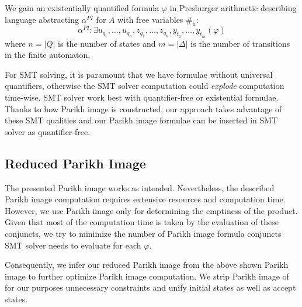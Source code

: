 We gain an existentially quantified formula $\varphi$ in Presburger arithmetic describing language abstracting $\alpha^{PI}$ for $A$ with free variables $\#_a$:
$$ \alpha^{PI} : \exists u_{q_1},\ldots,u_{q_n},z_{q_1},\ldots,z_{q_n},y_{t_1},\ldots,y_{t_m} ( \varphi ) $$
where $n = \lvert Q \rvert$ is the number of states and $m = \lvert \Delta \rvert$ is the number of transitions in the finite automaton.

For SMT solving, it is paramount that we have formulae without universal quantifiers, otherwise the SMT solver computation could \emph{explode} computation time-wise. SMT solver work best with quantifier-free or existential formulae. Thanks to how Parikh image is constructed, our approach takes advantage of these SMT qualities and our Parikh image formulae can be inserted in SMT solver as quantifier-free.

\subsection{Reduced Parikh Image}\label{sec:reducedParikhImage}

The presented Parikh image works as intended. Nevertheless, the described Parikh image computation requires extensive resources and computation time. However, we use Parikh image only for determining the emptiness of the product. Given that most of the computation time is taken by the evaluation of these conjuncts, we try to minimize the number of Parikh image formula conjuncts SMT solver needs to evaluate for each $\varphi$.

Consequently, we infer our reduced Parikh image from the above shown Parikh image to further optimize Parikh image computation. We strip Parikh image of for our purposes unnecessary constraints and unify initial states as well as accept states.


